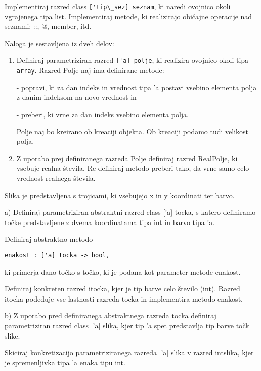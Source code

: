 \begin{ex}
Implementiraj razred class \lstinline{['tip\_sez] seznam}, ki naredi ovojnico okoli vgrajenega tipa list. Implementiraj metode, ki realizirajo obi\v cajne operacije nad seznami: ::, @, member, itd.



\end{ex}
\begin{ex}
Naloga je sestavljena iz dveh delov:
\begin{enumerate}
\item Definiraj parametriziran razred \lstinline{['a] polje}, ki realizira ovojnico okoli tipa \lstinline{array}. Razred Polje naj ima definirane metode:

- popravi, ki za dan indeks in vrednost tipa 'a postavi vsebino elementa polja z danim indeksom na novo vrednost in

- preberi, ki vrne za dan indeks vsebino elementa polja. 

Polje naj bo kreirano ob kreaciji objekta. Ob kreaciji podamo tudi velikost polja.

\item Z uporabo prej definiranega razreda Polje definiraj razred RealPolje, ki vsebuje realna \v stevila. Re-definiraj metodo preberi tako, da vrne samo celo vrednost realnega \v stevila.
\end{enumerate}



\end{ex}
\begin{ex}
Slika je predstavljena s trojicami, ki vsebujejo x in y koordinati ter barvo.

a) Definiraj parametriziran abstraktni razred class ['a] tocka, s katero definiramo to\v cke predstavljene z dvema koordinatama tipa int in barvo tipa 'a. 

Definiraj abstraktno metodo 
\begin{lstlisting}
enakost : ['a] tocka -> bool, 
\end{lstlisting}
ki primerja dano to\v cko s to\v cko, ki je podana kot parameter metode enakost. 

Definiraj konkreten razred itocka, kjer je tip barve celo \v stevilo (int). Razred itocka podeduje vse lastnosti razreda tocka in implementira metodo enakost.

b) Z uporabo pred definiranega abstraktnega razreda tocka definiraj parametriziran razred class ['a] slika, kjer tip 'a spet predstavlja tip barve to\v ck slike. 

Skiciraj konkretizacijo parametriziranega razreda ['a] slika v razred intslika, kjer je spremenljivka tipa 'a enaka tipu int.
\end{ex}

